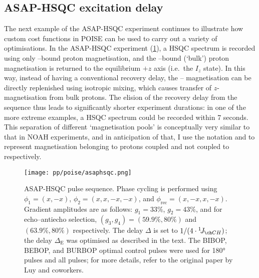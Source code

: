 \subsection{ASAP-HSQC excitation delay}
\label{subsec:poise__asaphsqc}

The next example of the ASAP-HSQC experiment\autocite{SchulzeSunninghausen2014JACS,SchulzeSunninghausen2017JMR,Koos2019JMR,Becker2019JMR} continues to illustrate how custom cost functions in POISE can be used to carry out a variety of optimisations.
In the ASAP-HSQC experiment (\cref{fig:asaphsqc_pulseq}), a HSQC spectrum is recorded using only \carbon{}--bound proton magnetisation, and the \carbont{}--bound (`bulk') proton magnetisation is returned to the equilibrium $+z$ axis (i.e.\ the $I_z$ state).
In this way, instead of having a conventional recovery delay, the \carbon{}--\proton{} magnetisation can be directly replenished using isotropic mixing, which causes transfer of $z$-magnetisation from bulk protons.
The elision of the recovery delay from the sequence thus leads to significantly shorter experiment durations: in one of the more extreme examples, a HSQC spectrum could be recorded within 7 seconds.
This separation of different `magnetisation pools' is conceptually very similar to that in NOAH experiments, and in anticipation of that, I use the notation  and  to represent magnetisation belonging to protons coupled and not coupled to \carbon{} respectively.

\begin{figure}[htb]
    \centering
    \texttt{[image: pp/poise/asaphsqc.png]}%
    \caption[ASAP-HSQC pulse sequence]{
        ASAP-HSQC pulse sequence.
        Phase cycling is performed using $\phi_1 = (x, -x)$, $\phi_2 = (x, x, -x, -x)$, and $\phi_\text{rec} = (x, -x, x, -x)$.
        Gradient amplitudes are as follows: $g_1 = 33\%$, $g_2 = 43\%$, and for echo--antiecho selection, $(g_3, g_4) = (59.9\%, 80\%)$ and $(63.9\%, 80\%)$ respectively.
        The delay $\Delta$ is set to $1/(4 \cdot \oneJ{CH})$; the delay $\Delta_\text{E}$ was optimised as described in the text.
        The BIBOP, BEBOP, and BURBOP optimal control pulses\autocite{Kobzar2004JMR,Kobzar2008JMR,Kobzar2012JMR} were used for \proton{} \ang{180} pulses and all \carbon{} pulses; for more details, refer to the original paper by Luy and coworkers\autocite{SchulzeSunninghausen2014JACS}.
    }
    \label{fig:asaphsqc_pulseq}
\end{figure}

